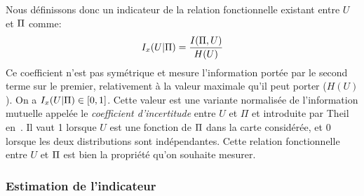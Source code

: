 \documentclass[../main]{subfiles}
\begin{document}
Nous définissons donc un indicateur de la relation fonctionnelle existant entre $U$ et $\Pi$ comme:
\begin{equation}
I_x(U|\Pi) = \frac{I(\Pi,U)}{H(U)}
\end{equation}
Ce coefficient n'est pas symétrique et mesure l'information portée par le second terme sur le premier, relativement à la valeur maximale qu'il peut porter ($H(U)$). On a $I_x(U|\Pi) \in [0,1]$. Cette valeur est une variante normalisée de l'information mutuelle appelée le \emph{coefficient d'incertitude} entre $U$ et $\Pi$ et introduite par Theil en~\cite{Theil1961EconomicFA}.
Il vaut 1 lorsque $U$ est une fonction de $\Pi$ dans la carte considérée, et $0$ lorsque les deux distributions sont indépendantes. Cette relation fonctionnelle entre $U$ et $\Pi$ est bien la propriété qu'on souhaite mesurer.


\subsubsection{Estimation de l'indicateur}
\end{document}
